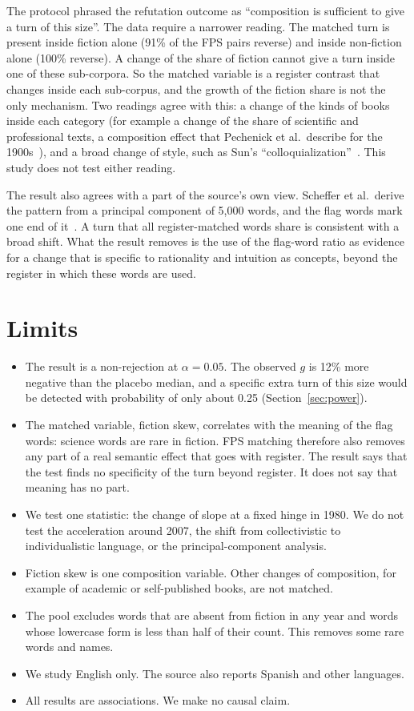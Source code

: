 \documentclass[11pt]{article}
\begin{document}
The protocol phrased the refutation outcome as ``composition is sufficient to give a turn of this size''. The data require a narrower reading. The matched turn is present inside fiction alone (91\% of the FPS pairs reverse) and inside non-fiction alone (100\% reverse). A change of the share of fiction cannot give a turn inside one of these sub-corpora. So the matched variable is a register contrast that changes inside each sub-corpus, and the growth of the fiction share is not the only mechanism. Two readings agree with this: a change of the kinds of books inside each category (for example a change of the share of scientific and professional texts, a composition effect that Pechenick et al.\ describe for the 1900s~\cite{pechenick}), and a broad change of style, such as Sun's ``colloquialization''~\cite{sun}. This study does not test either reading.

The result also agrees with a part of the source's own view. Scheffer et al.\ derive the pattern from a principal component of 5,000 words, and the flag words mark one end of it~\cite{scheffer}. A turn that all register-matched words share is consistent with a broad shift. What the result removes is the use of the flag-word ratio as evidence for a change that is specific to rationality and intuition as concepts, beyond the register in which these words are used.

\section{Limits}\label{sec:limits}
\begin{itemize}
\item The result is a non-rejection at $\alpha = 0.05$. The observed $g$ is 12\% more negative than the placebo median, and a specific extra turn of this size would be detected with probability of only about 0.25 (Section~\ref{sec:power}).
\item The matched variable, fiction skew, correlates with the meaning of the flag words: science words are rare in fiction. FPS matching therefore also removes any part of a real semantic effect that goes with register. The result says that the test finds no specificity of the turn beyond register. It does not say that meaning has no part.
\item We test one statistic: the change of slope at a fixed hinge in 1980. We do not test the acceleration around 2007, the shift from collectivistic to individualistic language, or the principal-component analysis.
\item Fiction skew is one composition variable. Other changes of composition, for example of academic or self-published books, are not matched.
\item The pool excludes words that are absent from fiction in any year and words whose lowercase form is less than half of their count. This removes some rare words and names.
\item We study English only. The source also reports Spanish and other languages.
\item All results are associations. We make no causal claim.
\end{itemize}
\end{document}
